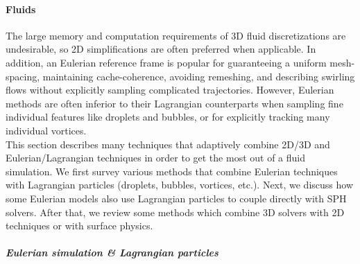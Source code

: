 \paragraph{Fluids}
The large memory and computation requirements of 3D fluid discretizations are undesirable, so 2D simplifications are often preferred when applicable. In addition, an Eulerian reference frame is popular for guaranteeing a uniform mesh-spacing, maintaining cache-coherence, avoiding remeshing, and describing swirling flows without explicitly sampling complicated trajectories. However, Eulerian methods are often inferior to their Lagrangian counterparts when sampling fine individual features like droplets and bubbles, or for explicitly tracking many individual vortices.
\\
This section describes many techniques that adaptively combine 2D/3D and Eulerian/Lagrangian techniques in order to get the most out of a fluid simulation. We first survey various methods that combine Eulerian techniques with Lagrangian particles (droplets, bubbles, vortices, etc.). Next, we discuss how some Eulerian models also use Lagrangian particles to couple directly with SPH solvers. After that, we review some methods which combine 3D solvers with 2D techniques or with surface physics.

\subparagraph*{Eulerian simulation \& Lagrangian particles}

